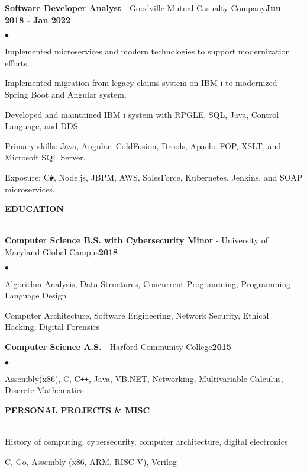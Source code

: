 \documentclass[a4paper]{article}
\newcommand{\resumeheader}[1]{
    \vspace*{8pt}
    \textbf{#1}\vspace*{-6pt}\vspace*{-4pt}\\ \hrulefill\\
    \vspace*{8pt}
}
\newcommand{\history}[3]{
    \textbf{#1} - #2\hfill\textbf{#3}
}
\newcommand{\interests}[2]{
    \textbf{\makebox[62pt][l]{#1}} #2\\\vspace*{6pt}
}
\newenvironment{resumelist}{
    \vspace*{4pt}
    \begin{list}
        {\small$\bullet$}{\topsep 0pt \itemsep -2pt \leftmargin=22pt}}{\vspace*{4pt}
    \end{list}
}
\begin{document}
        \history{Software Developer Analyst}{Goodville Mutual Casualty Company}{Jun 2018 - Jan 2022}
            \begin{resumelist}
                \item Implemented microservices and modern technologies to support modernization efforts.
                \item Implemented migration from legacy claims system on IBM i to modernized Spring Boot and Angular system.
                \item Developed and maintained IBM i system with RPGLE, SQL, Java, Control Language, and DDS.
                \item Primary skills: Java, Angular, ColdFusion, Drools, Apache FOP, XSLT, and Microsoft SQL Server.
                \item Exposure: C\texttt{\#}, Node.js, JBPM, AWS, SalesForce, Kubernetes, Jenkins, and SOAP microservices.
            \end{resumelist}

    \resumeheader{EDUCATION}

        \history{Computer Science B.S. with Cybersecurity Minor}{University of Maryland Global Campus}{2018}
            \begin{resumelist}
                \item Algorithm Analysis, Data Structures, Concurrent Programming, Programming Language Design
                \item Computer Architecture, Software Engineering, Network Security, Ethical Hacking, Digital Forensics
            \end{resumelist}
        \vspace*{6pt}

        \history{Computer Science A.S.}{Harford Community College}{2015}
            \begin{resumelist}
                \item Assembly(x86), C, C\texttt{++}, Java, VB.NET, Networking, Multivariable Calculus, Discrete Mathematics
            \end{resumelist}
    
    \resumeheader{PERSONAL PROJECTS \& MISC}
        
        \interests{Interests:}{History of computing, cybersecurity, computer architecture, digital electronics}
        \interests{Self-Taught:}{C, Go, Assembly (x86, ARM, RISC-V), Verilog}
        \vspace*{12pt}
\end{document}
